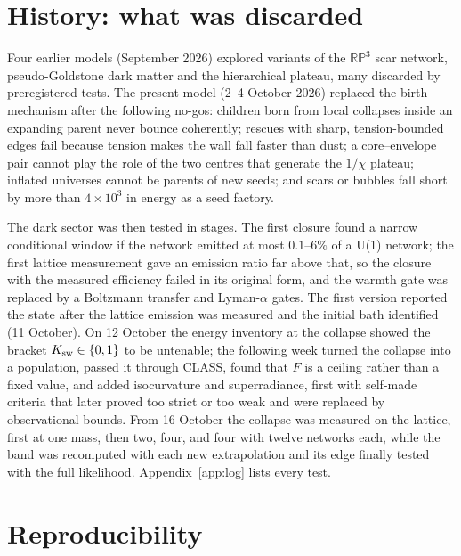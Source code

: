 \documentclass[11pt,a4paper]{article}
\newcommand{\RP}{\mathbb{RP}^3}
\begin{document}
\section{History: what was discarded}
\label{sec:history}

Four earlier models (September 2026) explored variants of the $\RP$ scar network, pseudo-Goldstone dark matter and the hierarchical plateau, many discarded by preregistered tests.
The present model (2--4 October 2026) replaced the birth mechanism after the following no-gos:
children born from local collapses inside an expanding parent never bounce coherently;
rescues with sharp, tension-bounded edges fail because tension makes the wall fall faster than dust;
a core--envelope pair cannot play the role of the two centres that generate the $1/\chi$ plateau;
inflated universes cannot be parents of new seeds;
and scars or bubbles fall short by more than $4\times10^3$ in energy as a seed factory.

The dark sector was then tested in stages.
The first closure found a narrow conditional window if the network emitted at most $0.1$--$6\%$ of a U(1) network; the first lattice measurement gave an emission ratio far above that, so the closure with the measured efficiency failed in its original form, and the warmth gate was replaced by a Boltzmann transfer and Lyman-$\alpha$ gates.
The first version reported the state after the lattice emission was measured and the initial bath identified (11 October).
On 12 October the energy inventory at the collapse showed the bracket $K_{\rm sw}\in\{0,1\}$ to be untenable; the following week turned the collapse into a population, passed it through CLASS, found that $F$ is a ceiling rather than a fixed value, and added isocurvature and superradiance, first with self-made criteria that later proved too strict or too weak and were replaced by observational bounds.
From 16 October the collapse was measured on the lattice, first at one mass, then two, four, and four with twelve networks each, while the band was recomputed with each new extrapolation and its edge finally tested with the full likelihood.
Appendix~\ref{app:log} lists every test.

\section{Reproducibility}
\end{document}
